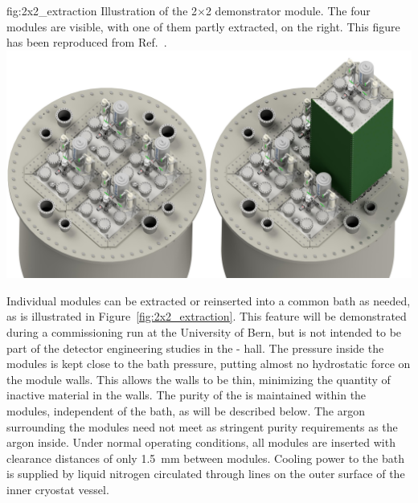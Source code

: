 \begin{dunefigure} %
{fig:2x2_extraction}
{Illustration of the  2$\times$2 demonstrator module. The four modules are visible, with one of them partly extracted, on the right. This figure has been reproduced from Ref.~\cite{argoncube_loi}.}
\includegraphics[width=\textwidth]{graphics/BathAndModule.jpeg}
\end{dunefigure}

Individual modules can be extracted or reinserted into a common  bath as needed, as is illustrated in Figure~\ref{fig:2x2_extraction}. This feature will be demonstrated during a commissioning run at the University of Bern, but is not intended to be part of the detector engineering studies in the - hall. The pressure inside the modules is kept close to the bath pressure, putting almost no hydrostatic force on the module walls.  This allows the walls to be thin, minimizing the quantity of inactive material in the walls. The purity of the  is maintained within the modules, independent of the bath, as will be described below. The argon surrounding the modules need not meet as stringent purity requirements as the argon inside. Under normal operating conditions, all modules are inserted with  clearance distances of only \SI{1.5}{\milli\metre} between modules. Cooling power to the bath is supplied by liquid nitrogen circulated through lines on the outer surface of the inner cryostat vessel.


